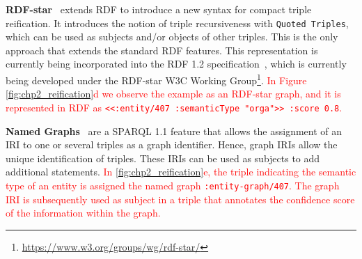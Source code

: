 \noindent\textbf{RDF-star}~\cite{hartig2017foundations,hartig2023rdf12} extends RDF to introduce a new syntax for compact triple reification. 
It introduces the notion of triple recursiveness with \texttt{Quoted Triples}, which can be used as subjects and/or objects of other triples. This is the only approach that extends the standard RDF features. 
This representation is currently being incorporated into the RDF 1.2 specification~\cite{hartig2023rdf12}, which is currently being developed under the RDF-star W3C Working Group\footnote{\url{https://www.w3.org/groups/wg/rdf-star/}}.
\textcolor{red}{In Figure \ref{fig:chp2_reification}d we observe the example as an RDF-star graph, and it is represented in RDF as \texttt{{<<:entity/407 :semanticType "orga">> :score 0.8}}.}


\noindent\textbf{Named Graphs}~\parencite{cyganiak2014rdf11} are a SPARQL 1.1 feature that allows the assignment of an IRI to one or several triples as a graph identifier. Hence, graph IRIs allow the unique identification of triples. These IRIs can be used as subjects to add additional statements. \textcolor{red}{In \cref{fig:chp2_reification}e, the triple indicating the semantic type of an entity is assigned the named graph \texttt{:entity-graph/407}. The graph IRI is subsequently used as subject in a triple that annotates the confidence score of the information within the graph. }